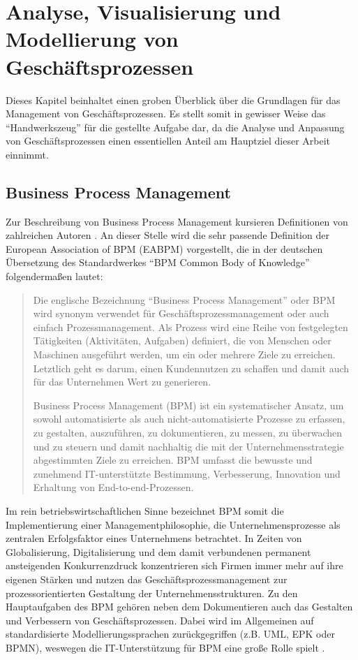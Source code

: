\documentclass[a4paper,12pt]{report}
\begin{document}
\section{Analyse, Visualisierung und Modellierung von Geschäftsprozessen}\label{sec:BPM}
Dieses Kapitel beinhaltet einen groben Überblick über die Grundlagen für das Management von Geschäftsprozessen. Es stellt somit in gewisser Weise das "`Handwerkszeug"' für die gestellte Aufgabe dar, da die Analyse und Anpassung von Geschäftsprozessen einen essentiellen Anteil am Hauptziel dieser Arbeit einnimmt.
\subsection{Business Process Management}\label{subsec:BPManagement}
Zur Beschreibung von Business Process Management kursieren Definitionen von zahlreichen Autoren \citep[vgl.][S. 1]{Freund2014}. An dieser Stelle wird die sehr passende Definition der European Association of BPM (EABPM) vorgestellt, die in der deutschen Übersetzung des Standardwerkes "`BPM Common Body of Knowledge"' \cite[S. 38ff.]{Eabpm2009} folgendermaßen lautet:

\begin{quote}
Die englische Bezeichnung "`Business Process Management"' oder BPM wird synonym verwendet für Geschäftsprozessmanagement oder auch einfach Prozessmanagement. Als Prozess wird eine Reihe von festgelegten Tätigkeiten (Aktivitäten, Aufgaben) definiert, die von Menschen oder Maschinen ausgeführt werden, um ein oder mehrere Ziele zu erreichen. Letztlich geht es darum, einen Kundennutzen zu schaffen und damit auch für das Unternehmen Wert zu generieren.

Business Process Management (BPM) ist ein systematischer Ansatz, um sowohl automatisierte als auch nicht-automatisierte Prozesse zu erfassen, zu gestalten, auszuführen, zu dokumentieren, zu messen, zu überwachen und zu steuern und damit nachhaltig die mit der Unternehmensstrategie abgestimmten Ziele zu erreichen. BPM umfasst die bewusste und zunehmend IT-unterstützte Bestimmung, Verbesserung, Innovation und Erhaltung von End-to-end-Prozessen.
\end{quote}

Im rein betriebswirtschaftlichen Sinne bezeichnet \ac{BPM} somit die Implementierung einer Managementphilosophie, die Unternehmensprozesse als zentralen Erfolgsfaktor eines Unternehmens betrachtet. In Zeiten von Globalisierung, Digitalisierung und dem damit verbundenen permanent ansteigenden Konkurrenzdruck konzentrieren sich Firmen immer mehr auf ihre eigenen Stärken und nutzen das Geschäftsprozessmanagement zur prozessorientierten Gestaltung der Unternehmensstrukturen. Zu den Hauptaufgaben des \ac{BPM} gehören neben dem Dokumentieren auch das Gestalten und Verbessern von Geschäftsprozessen. Dabei wird im Allgemeinen auf standardisierte Modellierungssprachen zurückgegriffen (z.B. UML, EPK oder BPMN), weswegen die IT-Unterstützung für \ac{BPM} eine große Rolle spielt \citep[vgl.][S. 1ff.]{Becker2009}. 
\end{document}
